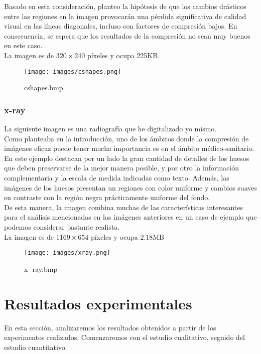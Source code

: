 \documentclass[12pt,a4paper]{article}
\begin{document}
Basado en esta consideración, planteo la hipótesis de que los cambios drásticos entre las regiones en la imagen provocarán una pérdida significativa de calidad visual en las líneas diagonales, incluso con factores de compresión bajos. En consecuencia, se espera que los resultados de la compresión no sean muy buenos en este caso.\\

La imagen es de $320\times240$ píxeles y ocupa 225KB.\\

\begin{figure}[H]
    \centering
    \texttt{[image: images/cshapes.png]}
    \caption{cshapes.bmp}
    
\end{figure}

\break
\subsubsection{x-ray}
La siguiente imagen es una radiografía que he digitalizado yo mismo.\\

Como planteaba en la introducción, uno de los ámbitos donde la compresión de imágenes eficaz puede tener mucha importancia es en el ámbito médico-sanitario.\\

En este ejemplo destacan por un lado la gran cantidad de detalles de los huesos que deben preservarse de la mejor manera posible, y por otro la información complementaria y la escala de medida indicadas como texto. Además, las imágenes de los huesos presentan un regiones con color uniforme y cambios suaves en contraste con la región negra prácticamente uniforme del fondo.\\

De esta manera, la imagen combina muchas de las características interesantes para el análisis mencionadas en las imágenes anteriores en un caso de ejemplo que podemos considerar bastante realista.\\

La imagen es de $1169\times654$ píxeles y ocupa $2.18$MB

\begin{figure}[H]
    \centering
    \texttt{[image: images/xray.png]}
    \caption{x- ray.bmp}
\end{figure}

\break

\newpage
\section{Resultados experimentales}
En esta sección, analizaremos los resultados obtenidos a partir de los experimentos realizados. Comenzaremos con el estudio cualitativo, seguido del estudio cuantitativo.
\end{document}

